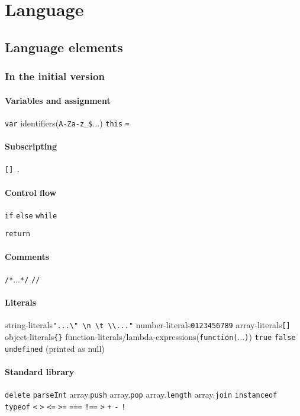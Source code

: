 \chapter{Language}

\section{Language elements}

\subsection{In the initial version}

\subsubsection{Variables and assignment}
\verb|var|
identifiers(\verb|A-Za-z_$|...)
\verb|this|
\verb|=|

\subsubsection{Subscripting}
\verb|[]|
\verb|.|

\subsubsection{Control flow}
\verb|if| \verb|else| \verb|while|

\verb|return|

\subsubsection{Comments}
\verb|/*|...\verb|*/|
\verb|//|
\subsubsection{Literals}
string-literals\verb|"...\" \n \t \\..."|
number-literals\verb|0123456789|
array-literals\verb|[]|
object-literals\verb|{}|
function-literals/lambda-expressions(\verb|function(|...\verb|)|)
\verb|true|
\verb|false|
\verb|undefined| (printed as null)

\subsubsection{Standard library}
\verb|delete|
\verb|parseInt|
array.\verb|push|
array.\verb|pop|
array.\verb|length|
array.\verb|join|
\verb|instanceof|
\verb|typeof|
\verb|<|
\verb|>|
\verb|<=| 
\verb|>=|
\verb|===|
\verb|!==|
\verb|>|
\verb|+|
\verb|-|
\verb|!|

